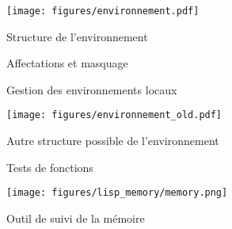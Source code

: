 \begin{figure}[h]
  \centering
  \texttt{[image: figures/environnement.pdf]}
  \caption{Structure de l'environnement}
  \label{fig:struct}
\end{figure}

\begin {figure} [h]
  \centering
  \quad
  \caption{Affectations et masquage}
  \label{fig:assign}
\end{figure}

\begin {figure} [h]
  \centering
  \quad
  \quad
  \caption{Gestion des environnements locaux}
  \label{fig:local}
\end{figure}

\begin{figure}[h]
  \centering
  \texttt{[image: figures/environnement\_old.pdf]}
  \caption{Autre structure possible de l'environnement}
  \label{fig:old}
\end{figure}

\begin {figure} [h]
  \centering
  \newline
  \centering
  \caption{Tests de fonctions}
  \label{fig:fct}
\end{figure}

\begin{figure}[h]
  \centering
  \texttt{[image: figures/lisp\_memory/memory.png]}
  \caption{Outil de suivi de la mémoire}
  \label{fig:mem}
\end{figure}
